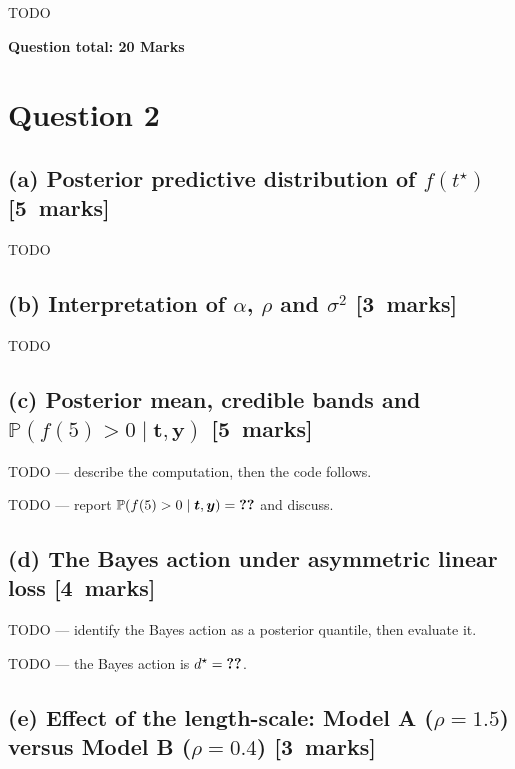 \documentclass[11pt,a4paper]{article}
\makeatletter
\newcommand{\y}{\bm{y}}
\newcommand{\tv}{\bm{t}}
\newcommand{\Prob}{\mathbb{P}}
\newcommand{\pycode}[2]{}
\newcommand{\result}[1]{%
  \ifcsname result@#1\endcsname\csname result@#1\endcsname\else\textbf{??}\fi}
\newcommand{\partmarks}[1]{\hfill\normalfont\mbox{[#1 marks]}}
\newcommand{\questiontotal}[1]{%
  \vspace{6pt}\par\hfill\textbf{Question total: #1 Marks}\par}
\makeatother
\begin{document}
TODO

\questiontotal{20}

\clearpage
\section*{Question 2}

\subsection*{(a) Posterior predictive distribution of $f(t^\star)$ \partmarks{5}}

TODO

\subsection*{(b) Interpretation of $\alpha$, $\rho$ and $\sigma^2$ \partmarks{3}}

TODO

\subsection*{(c) Posterior mean, credible bands and $\Prob(f(5)>0\mid\tv,\y)$ \partmarks{5}}

TODO --- describe the computation, then the code follows.

\pycode{q2_gp_regression}{q2c}

TODO --- report $\Prob(f(5)>0\mid\tv,\y)=\result{q2.prob.positive}$ and discuss.


\subsection*{(d) The Bayes action under asymmetric linear loss \partmarks{4}}

TODO --- identify the Bayes action as a posterior quantile, then evaluate it.

\pycode{q2_gp_regression}{q2d}

TODO --- the Bayes action is $d^\star = \result{q2.bayes.action}$.

\subsection*{(e) Effect of the length-scale: Model A ($\rho=1.5$) versus Model B ($\rho=0.4$) \partmarks{3}}
\end{document}
